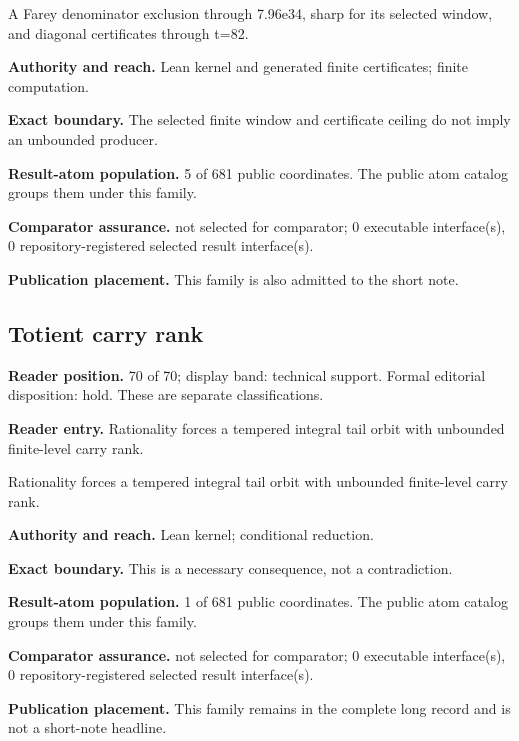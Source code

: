 A Farey denominator exclusion through 7.96e34, sharp for its selected window, and diagonal certificates through t=82.

\textbf{Authority and reach.} Lean kernel and generated finite certificates; finite computation.

\textbf{Exact boundary.} The selected finite window and certificate ceiling do not imply an unbounded producer.

\textbf{Result-atom population.} 5 of 681 public coordinates. The public atom catalog groups them under this family.

\textbf{Comparator assurance.} not selected for comparator; 0 executable interface(s), 0 repository-registered selected result interface(s).

\textbf{Publication placement.} This family is also admitted to the short note.

\subsection{Totient carry rank}
\textbf{Reader position.} 70 of 70; display band: technical support.  Formal editorial disposition: hold.  These are separate classifications.

\textbf{Reader entry.} Rationality forces a tempered integral tail orbit with unbounded finite-level carry rank.

Rationality forces a tempered integral tail orbit with unbounded finite-level carry rank.

\textbf{Authority and reach.} Lean kernel; conditional reduction.

\textbf{Exact boundary.} This is a necessary consequence, not a contradiction.

\textbf{Result-atom population.} 1 of 681 public coordinates. The public atom catalog groups them under this family.

\textbf{Comparator assurance.} not selected for comparator; 0 executable interface(s), 0 repository-registered selected result interface(s).

\textbf{Publication placement.} This family remains in the complete long record and is not a short-note headline.

